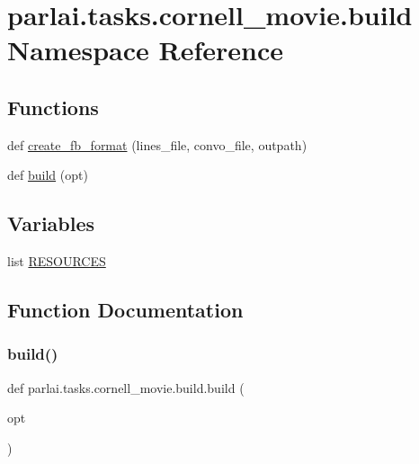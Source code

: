 \hypertarget{namespaceparlai_1_1tasks_1_1cornell__movie_1_1build}{}\section{parlai.\+tasks.\+cornell\+\_\+movie.\+build Namespace Reference}
\label{namespaceparlai_1_1tasks_1_1cornell__movie_1_1build}
\subsection*{Functions}
\begin{DoxyCompactItemize}
\item 
def \hyperlink{namespaceparlai_1_1tasks_1_1cornell__movie_1_1build_ad02efe0879bce0da293ba177112e1af3}{create\+\_\+fb\+\_\+format} (lines\+\_\+file, convo\+\_\+file, outpath)
\item 
def \hyperlink{namespaceparlai_1_1tasks_1_1cornell__movie_1_1build_aced5c0daa1d9fa613eb87535e22f1b47}{build} (opt)
\end{DoxyCompactItemize}
\subsection*{Variables}
\begin{DoxyCompactItemize}
\item 
list \hyperlink{namespaceparlai_1_1tasks_1_1cornell__movie_1_1build_a3ebe7bd780f6364ef3d5a12e120738cb}{R\+E\+S\+O\+U\+R\+C\+ES}
\end{DoxyCompactItemize}


\subsection{Function Documentation}
\mbox{\label{namespaceparlai_1_1tasks_1_1cornell__movie_1_1build_aced5c0daa1d9fa613eb87535e22f1b47}} 
\subsubsection{\texorpdfstring{build()}{build()}}
{\footnotesize\ttfamily def parlai.\+tasks.\+cornell\+\_\+movie.\+build.\+build (\begin{DoxyParamCaption}\item[{}]{opt }\end{DoxyParamCaption})}

